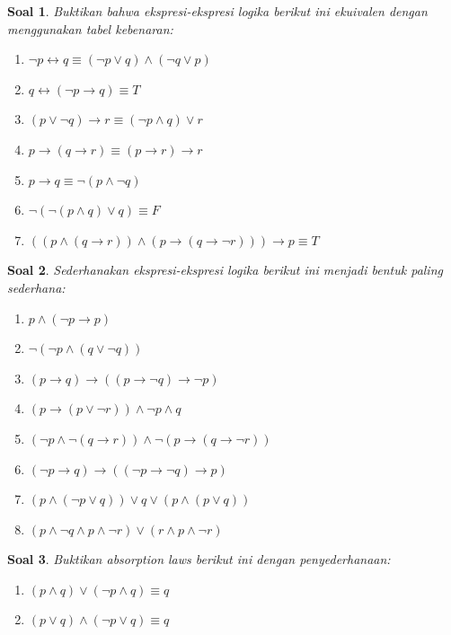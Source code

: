 \documentclass[12pt,a4paper]{article}
\theoremstyle{soaljarak}
\newtheorem{soal}{Soal}
\begin{document}
\begin{soal}
  Buktikan bahwa ekspresi-ekspresi logika berikut ini ekuivalen dengan menggunakan tabel kebenaran:
  \begin{enumerate}
    \item $\neg p \leftrightarrow q \equiv (\neg p \vee q)\wedge (\neg q \vee p)$
    \item $q \leftrightarrow (\neg p \rightarrow q) \equiv T$
    \item $(p \vee \neg q)\rightarrow r \equiv (\neg p \wedge q)\vee r$
    \item $p \rightarrow (q \rightarrow r) \equiv (p \rightarrow r)\rightarrow r$
    \item $p \rightarrow q \equiv \neg (p \wedge \neg q)$
    \item $\neg (\neg(p \wedge q)\vee q) \equiv F$
    \item $((p \wedge (q\rightarrow r))\wedge(p \rightarrow(q \rightarrow \neg r)))\rightarrow p \equiv T$
  \end{enumerate}
\end{soal}

\begin{soal}
  Sederhanakan ekspresi-ekspresi logika berikut ini menjadi bentuk paling sederhana:
  \begin{enumerate}
    \item $p \wedge (\neg p \rightarrow p)$
    \item $\neg (\neg p \wedge (q\vee \neg q))$
    \item $(p \rightarrow q)\rightarrow((p \rightarrow \neg q)\rightarrow \neg p)$
    \item $(p \rightarrow(p \vee \neg r))\wedge \neg p \wedge q$
    \item $(\neg p \wedge \neg (q \rightarrow r))\wedge \neg (p \rightarrow (q \rightarrow \neg r))$
    \item $(\neg p \rightarrow q)\rightarrow ((\neg p \rightarrow \neg q)\rightarrow p)$
    \item $(p \wedge (\neg p \vee q))\vee q \vee (p \wedge (p \vee q))$
    \item $(p \wedge \neg q \wedge p \wedge \neg r)\vee (r \wedge p \wedge \neg r)$
  \end{enumerate}
\end{soal}

\begin{soal}
  Buktikan \textit{absorption laws} berikut ini dengan penyederhanaan:
  \begin{enumerate}
    \item $(p \wedge q)\vee(\neg p \wedge q) \equiv q$
    \item $(p \vee q)\wedge(\neg p \vee q) \equiv q$
  \end{enumerate}
\end{soal}
\end{document}
